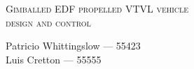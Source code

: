 {
\begin{frame}[plain]
  \vspace{-4.3cm}
               
  {\Large \scshape{\textrm{Gimballed EDF propelled VTVL vehicle \\
  design and control}} \par}
  \vspace{0cm}
  { \textrm{Patricio Whittingslow --- 55423 \\ Luis Cretton --- 55555 }}
  
\end{frame}
}